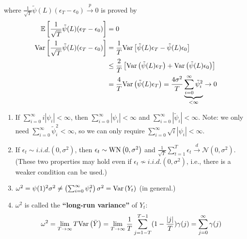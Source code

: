 \documentclass[11pt]{elegantbook}
\begin{document}
\begin{enumerate}
\begin{equation}
        \nonumber
    \end{equation}
    where $\frac{1}{\sqrt{T}}\tilde{\psi}(L)(\epsilon_T-\epsilon_0) \stackrel{p}{\longrightarrow} 0$ is proved by
    \begin{equation}
        \begin{aligned}
            \mathbb{E}\left[\frac{1}{\sqrt{T}}\tilde{\psi}(L)(\epsilon_T-\epsilon_0)\right]&=0\\
            \textnormal{Var}\left[\frac{1}{\sqrt{T}}\tilde{\psi}(L)(\epsilon_T-\epsilon_0)\right]&=\frac{1}{T}\textnormal{Var}\left[\tilde{\psi}(L)\epsilon_T-\tilde{\psi}(L)\epsilon_0\right]\\
            &\leq \frac{2}{T}\left[\textnormal{Var}\left(\tilde{\psi}(L)\epsilon_T\right)+\textnormal{Var}\left(\tilde{\psi}(L)\epsilon_0\right)\right]\\
            &=\frac{4}{T}\textnormal{Var}\left(\tilde{\psi}(L)\epsilon_T\right)=\frac{4\sigma^2}{T}\underbrace{\sum_{i=0}^\infty \tilde{\psi}_i^2}_{<\infty} \rightarrow 0
        \end{aligned}
        \nonumber
    \end{equation}
    \begin{remark}
        \begin{enumerate}
            \item If $\sum_{i=0}^\infty i|\psi_i|<\infty$, then $\sum_{i=0}^\infty |\psi_i|<\infty$ and $\sum_{i=0}^\infty |\tilde{\psi}_i|<\infty$. Note: we only need $\sum_{i=0}^\infty \tilde{\psi}_i^2<\infty$, so we can only require $\sum_{i=0}^\infty \sqrt{i}|\psi_i|<\infty$.
            \item If $\epsilon_t\sim{i.i.d.}\left(0,\sigma^2\right)$, then $\epsilon_t\sim \textnormal{WN}\left(0,\sigma^2\right)$ and $\frac{1}{\sqrt{T}}\sum_{t=1}^T\epsilon_t \stackrel{d}{\longrightarrow} \mathcal{N}\left(0,\sigma^2\right)$. (These two properties may hold even if $\epsilon_t\nsim{i.i.d.}\left(0,\sigma^2\right)$, i.e., there is a weaker condition can be used.)
            \item $\omega^2=\psi(1)^2\sigma^2\neq \left(\sum_{i=0}^\infty \psi_i^2\right)\sigma^2=\textnormal{Var}\left(Y_t\right)$ (in general.)
            \item $\omega^2$ is called the \textbf{``long-run variance''} of $Y_t$:
            \begin{equation}
                \begin{aligned}
                    \omega^2=\lim_{T \rightarrow \infty} T \textnormal{Var}\left(\bar{Y}\right)
                    =\lim_{T \rightarrow \infty} \frac{1}{T}\sum_{j=1-T}^{T-1}(1-\frac{|j|}{T})\gamma(j)
                    =\sum_{j=0}^\infty \gamma(j)
                \end{aligned}
                \nonumber
            \end{equation}
        \end{enumerate}
    \end{remark}
\end{enumerate}
\end{document}
